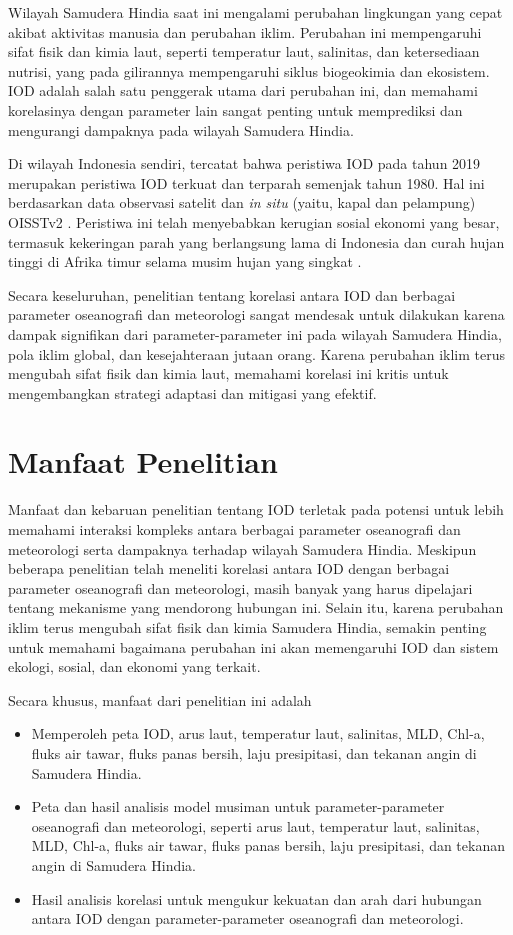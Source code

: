 \begin{spacing}{1.5}
	Wilayah Samudera Hindia saat ini mengalami perubahan lingkungan yang cepat akibat aktivitas manusia dan perubahan iklim. Perubahan ini mempengaruhi sifat fisik dan kimia laut, seperti temperatur laut, salinitas, dan ketersediaan nutrisi, yang pada gilirannya mempengaruhi siklus biogeokimia dan ekosistem. IOD adalah salah satu penggerak utama dari perubahan ini, dan memahami korelasinya dengan parameter lain sangat penting untuk memprediksi dan mengurangi dampaknya pada wilayah Samudera Hindia.

	Di wilayah Indonesia sendiri, tercatat bahwa peristiwa IOD pada tahun 2019 merupakan peristiwa IOD terkuat dan terparah semenjak tahun 1980. Hal ini berdasarkan data observasi satelit dan \textit{in situ} (yaitu, kapal dan pelampung) OISSTv2 \cite{Reynolds2002}. Peristiwa ini telah menyebabkan kerugian sosial ekonomi yang besar, termasuk kekeringan parah yang berlangsung lama di Indonesia dan curah hujan tinggi di Afrika timur selama musim hujan yang singkat \cite{Bo2020}.
	
	Secara keseluruhan, penelitian tentang korelasi antara IOD dan berbagai parameter oseanografi dan meteorologi sangat mendesak untuk dilakukan karena dampak signifikan dari parameter-parameter ini pada wilayah Samudera Hindia, pola iklim global, dan kesejahteraan jutaan orang. Karena perubahan iklim terus mengubah sifat fisik dan kimia laut, memahami korelasi ini kritis untuk mengembangkan strategi adaptasi dan mitigasi yang efektif.
	\section[Manfaat Penelitian]{Manfaat Penelitian}
	
	Manfaat dan kebaruan penelitian tentang IOD terletak pada potensi untuk lebih memahami interaksi kompleks antara berbagai parameter oseanografi dan meteorologi serta dampaknya terhadap wilayah Samudera Hindia. Meskipun beberapa penelitian telah meneliti korelasi antara IOD dengan berbagai parameter oseanografi dan meteorologi, masih banyak yang harus dipelajari tentang mekanisme yang mendorong hubungan ini.
	Selain itu, karena perubahan iklim terus mengubah sifat fisik dan kimia Samudera Hindia, semakin penting untuk memahami bagaimana perubahan ini akan memengaruhi IOD dan sistem ekologi, sosial, dan ekonomi yang terkait. 
	
	Secara khusus, manfaat dari penelitian ini adalah
	\begin{itemize}
		\item Memperoleh peta IOD, arus laut, temperatur laut, salinitas, MLD, Chl-a, fluks air tawar, fluks panas bersih, laju presipitasi, dan tekanan angin di Samudera Hindia.
		\item Peta dan hasil analisis model musiman untuk parameter-parameter oseanografi dan meteorologi, seperti arus laut, temperatur laut, salinitas, MLD, Chl-a, fluks air tawar, fluks panas bersih, laju presipitasi, dan tekanan angin di Samudera Hindia.
		\item Hasil analisis korelasi untuk mengukur kekuatan dan arah dari hubungan antara IOD dengan parameter-parameter oseanografi dan meteorologi.
	\end{itemize}
	

\end{spacing}
